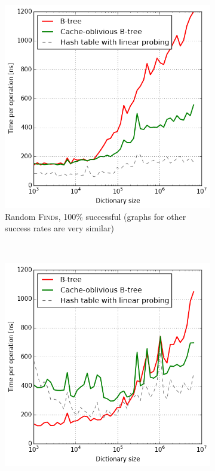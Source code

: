 \begin{figure}
\centering
\begin{subfigure}[t]{0.45\textwidth}
	\includegraphics[width=\textwidth]{img/performance/cob-performance-1-100}
	\caption{Random \textsc{Find}s, 100\% successful (graphs for
		other success rates are very similar)}
\end{subfigure}
~
\begin{subfigure}[t]{0.45\textwidth}
	\includegraphics[width=\textwidth]{img/performance/cob-performance-2}

\end{subfigure}
\end{figure}

